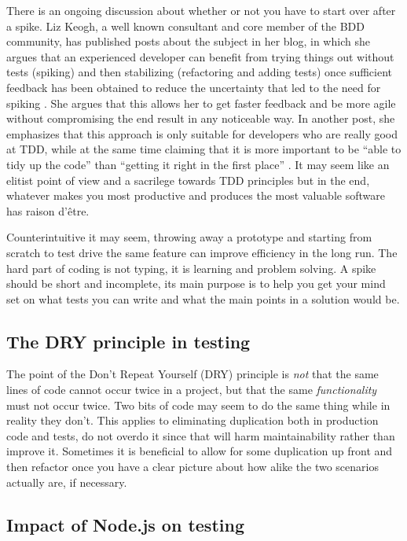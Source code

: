 \documentclass[11pt]{article}
\begin{document}
There is an ongoing discussion about whether or not you have to start over after a spike. Liz Keogh, a well known consultant and core member of the BDD community, has published posts about the subject in her blog, in which she argues that an experienced developer can benefit from trying things out without tests (spiking) and then stabilizing (refactoring and adding tests) once sufficient feedback has been obtained to reduce the uncertainty that led to the need for spiking \cite{Liz1}. She argues that this allows her to get faster feedback and be more agile without compromising the end result in any noticeable way. In another post, she emphasizes that this approach is only suitable for developers who are really good at TDD, while at the same time claiming that it is more important to be ``able to tidy up the code'' than ``getting it right in the first place'' \cite{Liz2}. It may seem like an elitist point of view and a sacrilege towards TDD principles but in the end, whatever makes you most productive and produces the most valuable software has raison d'être.

Counterintuitive it may seem, throwing away a prototype and starting from scratch to test drive the same feature can improve efficiency in the long run. The hard part of coding is not typing, it is learning and problem solving. A spike should be short and incomplete, its main purpose is to help you get your mind set on what tests you can write and what the main points in a solution would be. \cite[question~60]{Edelstam}

\subsection{The DRY principle in testing}

The point of the Don't Repeat Yourself (DRY) principle is \emph{not} that the same lines of code cannot occur twice in a project, but that the same \emph{functionality} must not occur twice. Two bits of code may seem to do the same thing while in reality they don't. This applies to eliminating duplication both in production code and tests, do not overdo it since that will harm maintainability rather than improve it. Sometimes it is beneficial to allow for some duplication up front and then refactor once you have a clear picture about how alike the two scenarios actually are, if necessary. \cite[questions~69-70]{Edelstam}

\subsection{Impact of Node.js on testing}
\end{document}
